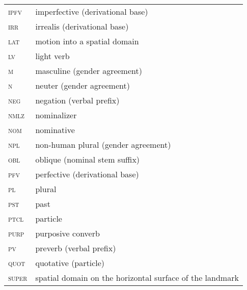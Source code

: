 ﻿\documentclass[output=paper]{langsci/langscibook}
\begin{document}
\begin{longtable}[l]{@{}ll@{}}
\textsc{ipfv}	& imperfective (derivational base) \\
\textsc{irr}	& irrealis (derivational base) \\
\textsc{lat}	& motion into a spatial domain \\
\textsc{lv}	& light verb \\
\textsc{m}	& masculine (gender agreement) \\
\textsc{n}	& neuter (gender agreement) \\
\textsc{neg}	& negation (verbal prefix) \\
\textsc{nmlz}	& nominalizer \\
\textsc{nom}	& nominative \\
\textsc{npl}	& non-human plural (gender agreement) \\
\textsc{obl}	& oblique (nominal stem suffix) \\
\textsc{pfv}	& perfective (derivational base) \\
\textsc{pl}	& plural \\
\textsc{pst}	& past \\
\textsc{ptcl}	& particle \\
\textsc{purp}	& purposive converb \\
\textsc{pv}	& preverb (verbal prefix) \\
\textsc{quot}	& quotative (particle) \\
\textsc{super}	& spatial domain on the horizontal surface of the landmark \\
\end{longtable}


\nocite{asher-kumari1997,ogawa1998}
\printbibliography[heading=subbibliography,notkeyword=this]
\end{document}
